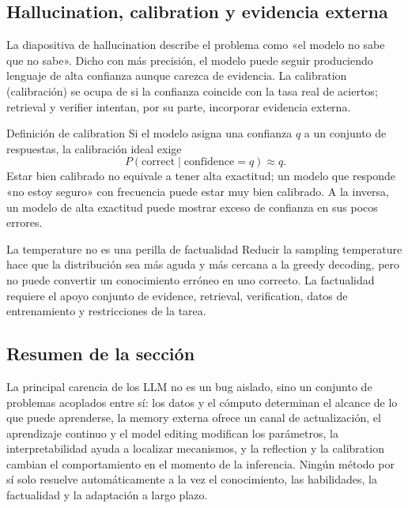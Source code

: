 \subsection{Hallucination, calibration y evidencia externa}

La diapositiva de hallucination describe el problema como «el modelo no sabe que no sabe». Dicho con más precisión, el modelo puede seguir produciendo lenguaje de alta confianza aunque carezca de evidencia. La calibration (calibración) se ocupa de si la confianza coincide con la tasa real de aciertos; retrieval y verifier intentan, por su parte, incorporar evidencia externa.


\begin{importantbox}{Definición de calibration}
Si el modelo asigna una confianza $q$ a un conjunto de respuestas, la calibración ideal exige
\[
P(\text{correct}\mid \text{confidence}=q)\approx q.
\]
Estar bien calibrado no equivale a tener alta exactitud; un modelo que responde «no estoy seguro» con frecuencia puede estar muy bien calibrado. A la inversa, un modelo de alta exactitud puede mostrar exceso de confianza en sus pocos errores.
\end{importantbox}

\begin{warningbox}{La temperature no es una perilla de factualidad}
Reducir la sampling temperature hace que la distribución sea más aguda y más cercana a la greedy decoding, pero no puede convertir un conocimiento erróneo en uno correcto. La factualidad requiere el apoyo conjunto de evidence, retrieval, verification, datos de entrenamiento y restricciones de la tarea.
\end{warningbox}

\subsection{Resumen de la sección}

La principal carencia de los LLM no es un bug aislado, sino un conjunto de problemas acoplados entre sí: los datos y el cómputo determinan el alcance de lo que puede aprenderse, la memory externa ofrece un canal de actualización, el aprendizaje continuo y el model editing modifican los parámetros, la interpretabilidad ayuda a localizar mecanismos, y la reflection y la calibration cambian el comportamiento en el momento de la inferencia. Ningún método por sí solo resuelve automáticamente a la vez el conocimiento, las habilidades, la factualidad y la adaptación a largo plazo.
